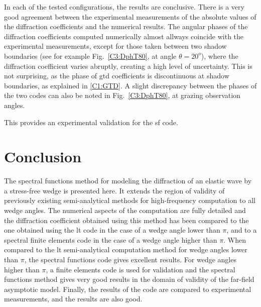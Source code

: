 In each of the tested configurations, the results are conclusive. There is a very good agreement between the experimental measurements of the absolute values of the diffraction coefficients and the numerical results. The angular phases of the diffraction coefficients computed numerically almost allways coincide with the experimental measurements, except for those taken between two shadow boundaries (see for example Fig.~\ref{C3:DphT80}, at angle $\theta=20^o$), where the diffraction coefficient varies abruptly, creating a high level of uncertainty. This is not surprising, as the phase of \acrshort{gtd} coefficients is discontinuous at shadow boundaries, as explained in \ref{C1:GTD}. A slight discrepancy between the phases of the two codes can also be noted in Fig.~\ref{C3:DphT80}, at grazing observation angles.

This provides an experimental validation for the \acrshort{sf} code.
\newpage

\section*{Conclusion}
The spectral functions method for modeling the diffraction of an elastic wave by a stress-free wedge is presented here. It extends the region of validity of previously existing semi-analytical methods for high-frequency computation to all wedge angles. The numerical aspects of the computation are fully detailed and the diffraction coefficient obtained using this method has been compared to the one obtained using the \acrfull{lt} code in the case of a wedge angle lower than $\pi$, and to a spectral finite elements code in the case of a wedge angle higher than $\pi$. 
When compared to the \acrfull{lt} semi-analytical computation method for wedge angles lower than $\pi$, the spectral functions code gives excellent results. For wedge angles higher than $\pi$, a finite elements code is used for validation and the spectral functions method gives very good results in the domain of validity of the far-field asymptotic model. Finally, the results of the code are compared to experimental measurements, and the results are also good.
